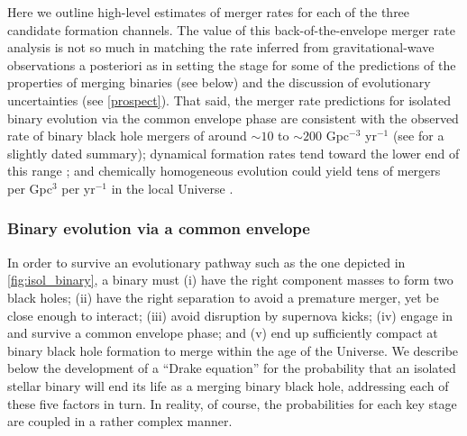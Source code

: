 \documentclass[iop,onecolumn]{revtex4-1}
\begin{document}
Here we outline high-level estimates of merger rates for each of the three candidate formation channels. The value of this back-of-the-envelope merger rate analysis is not so much in matching the rate inferred from gravitational-wave observations a posteriori as in setting the stage for some of the predictions of the properties of merging binaries (see below) and the discussion of evolutionary uncertainties (see \autoref{prospect}).  That said, the merger rate predictions for isolated binary evolution via the common envelope phase are consistent with the observed rate of binary black hole mergers of around $\sim 10$ to $\sim 200$ Gpc$^{-3}$ yr$^{-1}$ \citep{GW150914:rates,GW170104} (see \citet{ratesdoc} for a slightly dated summary); dynamical formation rates tend toward the lower end of this range \citep{Rodriguez:2016,Park:2017,FragioneKocsis:2018}; and chemically homogeneous evolution could yield tens of mergers per Gpc$^{3}$ per yr$^{-1}$ in the local Universe \citep{MandeldeMink:2016,Marchant:2016}.

\subsubsection{Binary evolution via a common envelope}\label{sec:CErates}

In order to survive an evolutionary pathway such as the one depicted in \autoref{fig:isol_binary}, a binary must (i) have the right component masses to form two black holes; (ii) have the right separation to avoid a premature merger, yet be close enough to interact; (iii) avoid disruption by supernova kicks; (iv) engage in and survive a common envelope phase; and (v) end up sufficiently compact at binary black hole formation to merge within the age of the Universe. We describe below the development of a ``Drake equation'' for the probability that an isolated stellar binary will end its life as a merging binary black hole, addressing each of these five factors in turn.   In reality, of course, the probabilities for each key stage are coupled in a rather complex manner.
\end{document}
